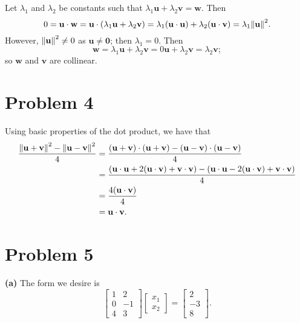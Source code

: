 \documentclass[11pt]{article}
\renewcommand{\vec}[1]{\mathbf{#1}}
\begin{document}
Let $\lambda_{1}$ and $\lambda_{2}$ be constants such that $\lambda_{1} \vec{u} + \lambda_{2} \vec{v} = \vec{w}$. Then
\[
	0 = \vec{u} \cdot \vec{w} = \vec{u} \cdot (\lambda_{1} \vec{u} + \lambda_{2} \vec{v}) = \lambda_{1} (\vec{u} \cdot \vec{u}) + \lambda_{2} (\vec{u} \cdot \vec{v}) = \lambda_{1} \norm{\vec{u}}^{2}.
\]
However, $\norm{\vec{u}}^{2} \ne 0$ as $\vec{u} \ne \vec{0}$; then $\lambda_{1} = 0$. Then 
\[	
\vec{w} = \lambda_{1} \vec{u} + \lambda_{2} \vec{v} = 0 \vec{u} + \lambda_{2} \vec{v} = \lambda_{2} \vec{v};
\]
so $\vec{w}$ and $\vec{v}$ are collinear.


\section{Problem 4}

Using basic properties of the dot product, we have that
\begin{align*}
	\frac{\norm{\vec{u} + \vec{v}}^{2} - \norm{\vec{u} - \vec{v}}^{2}}{4} &= \frac{(\vec{u} + \vec{v}) \cdot (\vec{u} + \vec{v}) - (\vec{u} - \vec{v}) \cdot (\vec{u} - \vec{v})}{4} \\
	&= \frac{(\vec{u} \cdot \vec{u} + 2 (\vec{u} \cdot \vec{v}) + \vec{v} \cdot \vec{v}) - (\vec{u} \cdot \vec{u} - 2(\vec{u} \cdot \vec{v}) + \vec{v} \cdot \vec{v} )}{4} \\
	&= \frac{4(\vec{u} \cdot \vec{v})}{4} \\
	&= \vec{u} \cdot \vec{v}.
\end{align*}


\section{Problem 5}

\textbf{(a)} The form we desire is
\[
	\begin{bmatrix}
		1 & 2 \\ 0 & -1 \\ 4 & 3
		\end{bmatrix} \begin{bmatrix} x_{1} \\ x_{2} \end{bmatrix} = \begin{bmatrix} 2 \\ -3 \\ 8 \end{bmatrix}.
\]
\end{document}
